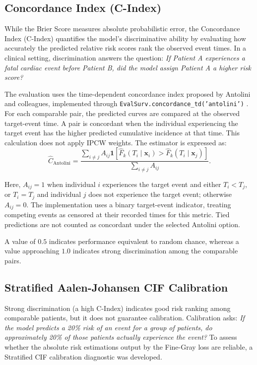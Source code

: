 \documentclass[a4paper,twoside,12pt]{report}
\begin{document}
\subsection{Concordance Index (C-Index)}
While the Brier Score measures absolute probabilistic error, the Concordance Index (C-Index) quantifies the model's discriminative ability by evaluating how accurately the predicted relative risk scores rank the observed event times. In a clinical setting, discrimination answers the question: \textit{If Patient A experiences a fatal cardiac event before Patient B, did the model assign Patient A a higher risk score?}

The evaluation uses the time-dependent concordance index proposed by Antolini and colleagues, implemented through \texttt{EvalSurv.concordance\_td('antolini')} \citep{Antolini2005}. For each comparable pair, the predicted curves are compared at the observed target-event time. A pair is concordant when the individual experiencing the target event has the higher predicted cumulative incidence at that time. This calculation does not apply IPCW weights. The estimator is expressed as:
\[
\widehat C_{\mathrm{Antolini}}
=
\frac{
\sum_{i\ne j}A_{ij}
\mathbf{1}\!\left[
\widehat F_k(T_i\mid\boldsymbol x_i)>
\widehat F_k(T_i\mid\boldsymbol x_j)
\right]
}{
\sum_{i\ne j}A_{ij}
}.
\]

Here, $A_{ij}=1$ when individual $i$ experiences the target event and either $T_i<T_j$, or $T_i=T_j$ and individual $j$ does not experience the target event; otherwise $A_{ij}=0$. The implementation uses a binary target-event indicator, treating competing events as censored at their recorded times for this metric. Tied predictions are not counted as concordant under the selected Antolini option.

A value of $0.5$ indicates performance equivalent to random chance, whereas a value approaching $1.0$ indicates strong discrimination among the comparable pairs.

\subsection{Stratified Aalen-Johansen CIF Calibration}
Strong discrimination (a high C-Index) indicates good risk ranking among comparable patients, but it does not guarantee calibration. Calibration asks: \textit{If the model predicts a 20\% risk of an event for a group of patients, do approximately 20\% of those patients actually experience the event?} To assess whether the absolute risk estimations output by the Fine-Gray loss are reliable, a Stratified CIF calibration diagnostic was developed.
\end{document}
